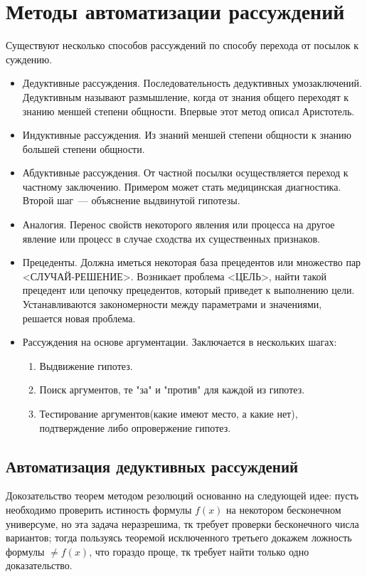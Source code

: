 \section{Методы автоматизации рассуждений}
Существуют несколько способов рассуждений по способу перехода от посылок к суждению.
\begin{itemize}
	\item Дедуктивные рассуждения. Последовательность дедуктивных умозаключений. Дедуктивным называют размышление, когда от знания общего переходят к знанию меншей степени общности. Впервые этот метод описал Аристотель.
	\item Индуктивные рассуждения. Из знаний меншей степени общности к знанию большей степени общности.
	\item Абдуктивные рассуждения. От частной посылки осуществляется переход к частному заключению. Примером может стать медицинская диагностика. Второй шаг~--- объяснение выдвинутой гипотезы.
	\item Аналогия. Перенос свойств некоторого явления или процесса на другое явление или процесс в случае сходства их существенных признаков.
	\item Прецеденты. Должна иметься некоторая база прецедентов или множество пар <СЛУЧАЙ-РЕШЕНИЕ>. Возникает проблема <ЦЕЛЬ>, найти такой прецедент или цепочку прецедентов, который приведет к выполнению цели. Устанавливаются закономерности между параметрами и значениями, решается новая проблема.
	\item Рассуждения на основе аргументации. Заключается в нескольких шагах:
	\begin{enumerate}
		\item Выдвижение гипотез.
		\item Поиск аргументов, те "за" и "против" для каждой из гипотез.
		\item Тестирование аргументов(какие имеют место, а какие нет), подтверждение либо опровержение гипотез.
	\end{enumerate}
\end{itemize}

\subsection{Автоматизация дедуктивных рассуждений}
Докозательство теорем методом резолюций основанно на следующей идее: пусть необходимо проверить истиность формулы $f(x)$ на некотором бесконечном универсуме, но эта задача неразрешима, тк требует проверки бесконечного числа вариантов; тогда пользуясь теоремой исключенного третьего докажем ложность формулы $\neq{}f(x)$, что гораздо проще, тк требует найти только одно доказательство.

